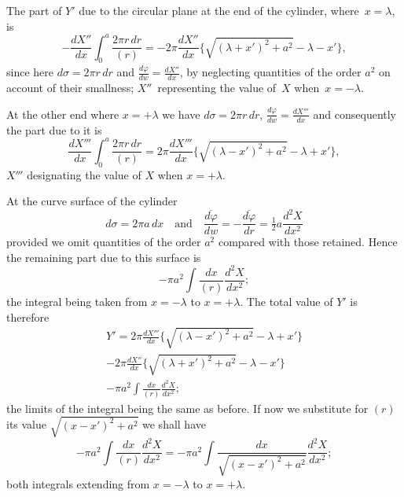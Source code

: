 \documentclass[12pt,notitlepage]{amsart}
\renewcommand{\phi}{\varphi}
\begin{document}
The part of $Y'$ due to the circular plane at the end of the cylinder,
where~$x=\lambda$, is
\[
-\frac{dX''}{dx}\int_0^a\frac{2\pi r\,dr}{(r)}
=-2\pi\frac{dX''}{dx}
\biggl\{\sqrt{(\lambda+x')^2+a^2}-\lambda-x'\biggr\},
\]
since here $d\sigma=2\pi r\,dr$
and $\frac{\overline{d\phi}}{dw}=\frac{dX''}{dx}$,
by neglecting quantities of the order
$a^2$ on account of their smallness;
$X''$~representing the value of~$X$ when~${x=-\lambda}$.

At the other end where $x=+\lambda$ we have
$d\sigma=2\pi r\,dr$, $\frac{{d\phi}}{dw}=\frac{dX'''}{dx}$
and consequently the part due to it is
\[
\frac{dX'''}{dx}\int_0^a\frac{2\pi r\,dr}{(r)}
=2\pi\frac{dX'''}{dx}
\biggl\{\sqrt{(\lambda-x')^2+a^2}-\lambda+x'\biggr\},
\]
$X'''$ designating the value of $X$ when $x=+\lambda$.

At the curve surface of the cylinder
\[
d\sigma=2\pi a\,dx
\quad\text{and}\quad
\frac{\overline{d\phi}}{dw}
=-\frac{\overline{d\phi}}{dr}
=\tfrac12a\frac{d^2X}{dx^2}
\]
provided we omit quantities of the order $a^2$ compared with those retained.
Hence the remaining part due to this surface is
\[
-\pi a^2\int\frac{dx}{(r)}\frac{d^2X}{dx^2};
\]
the integral being taken from $x=-\lambda$ to $x=+\lambda$.
The total value of $Y'$
is therefore
\begin{multline*}
Y'=
2\pi\frac{dX'''}{dx}
\biggl\{\sqrt{(\lambda-x')^2+a^2}-\lambda+x'\biggr\}\\
-2\pi\frac{dX''}{dx}
\biggl\{\sqrt{(\lambda+x')^2+a^2}-\lambda-x'\biggr\}\\
-\pi a^2\int\frac{dx}{(r)}\frac{d^2X}{dx^2};
\end{multline*}
the limits of the integral being the same as before. If now we substitute for
$(r)$ its value $\sqrt{(x-x')^2+a^2}$ we shall have
\[
-\pi a^2\int\frac{dx}{(r)}\frac{d^2X}{dx^2}
=-\pi a^2\int\frac{dx}{\sqrt{(x-x')^2+a^2}}\frac{d^2X}{dx^2};
\]
both integrals extending from $x=-\lambda$ to $x=+\lambda$.
\end{document}
